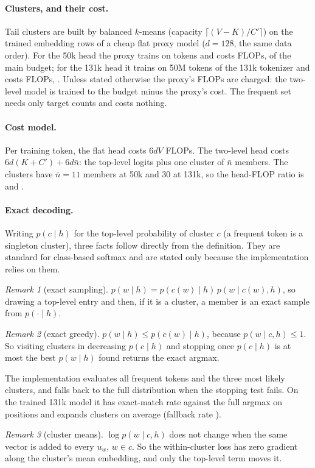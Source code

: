 \documentclass[11pt]{article}
\theoremstyle{remark}
\newtheorem{remark}{Remark}
\begin{document}
\paragraph{Clusters, and their cost.} Tail clusters are built by balanced $k$-means (capacity $\lceil (V - K)/C' \rceil$) on the
trained embedding rows of a cheap flat proxy model ($d=128$, the same data order). For the 50k head the proxy trains on
\ProxyFiftyTok{} tokens and costs \ProxyFiftyFlops{} FLOPs, \ProxyFiftyShare{} of the main budget; for the 131k head it trains on
50M tokens of the 131k tokenizer and costs \ProxyFlops{} FLOPs, \ProxyShare{}. Unless stated otherwise the proxy's FLOPs are
charged: the two-level model is trained to the budget minus the proxy's cost. The frequent set needs only target counts and
costs nothing.

\paragraph{Cost model.} Per training token, the flat head costs $6dV$ FLOPs. The two-level head costs $6d(K + C') + 6d\bar n$:
the top-level logits plus one cluster of $\bar n$ members. The clusters have $\bar n = 11$ members at 50k and 30 at 131k, so the
head-FLOP ratio is \HeadRatioFifty{} and \HeadRatioBig{}.

\paragraph{Exact decoding.} Writing $p(c \mid h)$ for the top-level probability of cluster $c$ (a frequent token is a singleton
cluster), three facts follow directly from the definition. They are standard for class-based softmax and are stated only
because the implementation relies on them.
\begin{remark}[exact sampling]
$p(w \mid h) = p(c(w) \mid h)\, p(w \mid c(w), h)$, so drawing a top-level entry and then, if it is a cluster, a member is an
exact sample from $p(\cdot \mid h)$.
\end{remark}
\begin{remark}[exact greedy]
$p(w \mid h) \le p(c(w) \mid h)$, because $p(w \mid c, h) \le 1$. So visiting clusters in decreasing $p(c \mid h)$ and stopping
once $p(c \mid h)$ is at most the best $p(w \mid h)$ found returns the exact argmax.
\end{remark}
\noindent The implementation evaluates all frequent tokens and the three most likely clusters, and falls back to the full
distribution when the stopping test fails. On the trained 131k model it has exact-match rate \GreedyExactBig{} against the full
argmax on \GreedyPosBig{} positions and expands \ClustersBig{} clusters on average (fallback rate \FallbackBig{}).
\begin{remark}[cluster means]
$\log p(w \mid c, h)$ does not change when the same vector is added to every $u_w$, $w \in c$. So the within-cluster loss has zero
gradient along the cluster's mean embedding, and only the top-level term moves it.
\end{remark}
\end{document}
